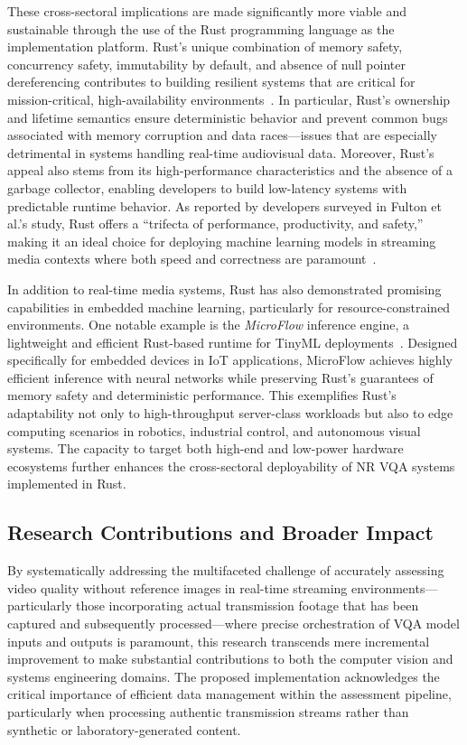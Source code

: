 These cross-sectoral implications are made significantly more viable and sustainable through the use of the Rust programming language as the implementation platform. Rust's unique combination of memory safety, concurrency safety, immutability by default, and absence of null pointer dereferencing contributes to building resilient systems that are critical for mission-critical, high-availability environments~\cite{fulton2022benefits}. In particular, Rust's ownership and lifetime semantics ensure deterministic behavior and prevent common bugs associated with memory corruption and data races—issues that are especially detrimental in systems handling real-time audiovisual data. Moreover, Rust's appeal also stems from its high-performance characteristics and the absence of a garbage collector, enabling developers to build low-latency systems with predictable runtime behavior. As reported by developers surveyed in Fulton et al.’s study, Rust offers a “trifecta of performance, productivity, and safety,” making it an ideal choice for deploying machine learning models in streaming media contexts where both speed and correctness are paramount~\cite{fulton2022benefits}.

In addition to real-time media systems, Rust has also demonstrated promising capabilities in embedded machine learning, particularly for resource-constrained environments. One notable example is the \emph{MicroFlow} inference engine, a lightweight and efficient Rust-based runtime for TinyML deployments~\cite{carnelos2025microflow}. Designed specifically for embedded devices in IoT applications, MicroFlow achieves highly efficient inference with neural networks while preserving Rust’s guarantees of memory safety and deterministic performance. This exemplifies Rust’s adaptability not only to high-throughput server-class workloads but also to edge computing scenarios in robotics, industrial control, and autonomous visual systems. The capacity to target both high-end and low-power hardware ecosystems further enhances the cross-sectoral deployability of NR VQA systems implemented in Rust.

\subsection{Research Contributions and Broader Impact}

By systematically addressing the multifaceted challenge of accurately assessing video quality without reference images in real-time streaming environments---particularly those incorporating actual transmission footage that has been captured and subsequently processed---where precise orchestration of VQA model inputs and outputs is paramount, this research transcends mere incremental improvement to make substantial contributions to both the computer vision and systems engineering domains. The proposed implementation acknowledges the critical importance of efficient data management within the assessment pipeline, particularly when processing authentic transmission streams rather than synthetic or laboratory-generated content.

